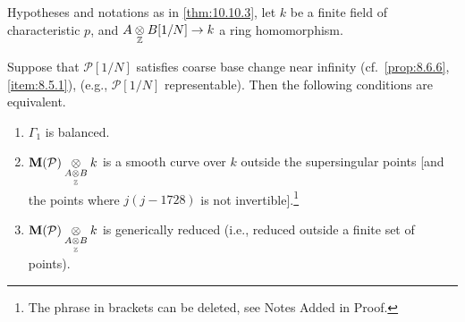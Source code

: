 \begin{kcor}\label{cor:10.10.6}
Hypotheses and notations as in \eqref{thm:10.10.3}, let $k$ be a finite field of characteristic $p$, and $A \underset{\mathbb{Z}}{\otimes} B[1/N] \to k$ a ring homomorphism.
\par
Suppose that $\mathcal{P}[1/N]$ satisfies coarse base change near infinity (cf.~\ref{prop:8.6.6}, \ref{item:8.5.1}), (e.g., $\mathcal{P}[1/N]$ representable). Then the following conditions are equivalent.
\begin{enumerate}[label=(\arabic*)]
\item $\Gamma_1$ is balanced.
\item $\mathbf{M}(\mathcal{P}) \underset{A \underset{\mathbb{Z}}{\otimes} B}{\otimes} k$ is a smooth curve over $k$ outside the supersingular points [and the points where $j(j-1728)$ is not invertible].{\renewcommand{\thefootnote}{*}\footnote{The phrase in brackets can be deleted, see Notes Added in Proof.}}
\item $\mathbf{M}(\mathcal{P}) \underset{A \underset{\mathbb{Z}}{\otimes} B}{\otimes} k$ is generically reduced (i.e., reduced outside a finite set of points).
\end{enumerate}
\end{kcor}

